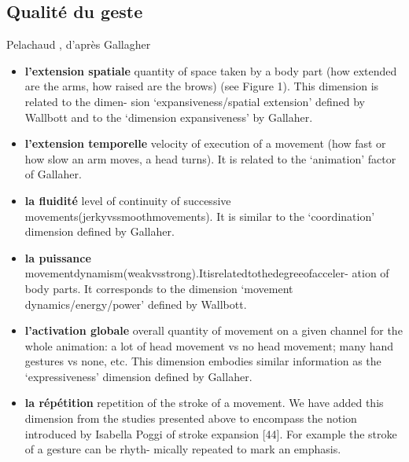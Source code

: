 \subsection{Qualité du geste}
Pelachaud \cite{pelachaud_studies_2009}, d'après Gallagher \cite{gallaher_individual_1992}
\vspace{-1em}
\begin{itemize}[noitemsep]
	\item \textbf{l'extension spatiale} quantity of space taken by a body part (how extended are the arms, how raised are the brows) (see Figure 1). This dimension is related to the dimen- sion ‘expansiveness/spatial extension’ defined by Wallbott and to the ‘dimension expansiveness’ by Gallaher.
	\item \textbf{l'extension temporelle} velocity of execution of a movement (how fast or how slow an arm moves, a head turns). It is related to the ‘animation’ factor of Gallaher.
	\item \textbf{la fluidité} level of continuity of successive movements(jerkyvssmoothmovements). It is similar to the ‘coordination’ dimension defined by Gallaher.
	\item \textbf{la puissance} movementdynamism(weakvsstrong).Itisrelatedtothedegreeofacceler- ation of body parts. It corresponds to the dimension ‘movement dynamics/energy/power’ defined by Wallbott.
	\item \textbf{l'activation globale} overall quantity of movement on a given channel for the whole animation: a lot of head movement vs no head movement; many hand gestures vs none, etc. This dimension embodies similar information as the ‘expressiveness’ dimension defined by Gallaher.
	\item \textbf{la répétition} repetition of the stroke of a movement. We have added this dimension from the studies presented above to encompass the notion introduced by Isabella Poggi of stroke expansion [44]. For example the stroke of a gesture can be rhyth- mically repeated to mark an emphasis.
\end{itemize}